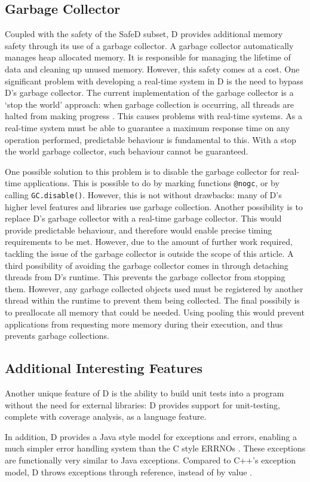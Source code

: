 \subsection{Garbage Collector}
Coupled with the safety of the SafeD subset, D provides additional memory
safety through its use of a garbage collector. A garbage collector
automatically manages heap allocated memory. It is responsible for managing
the lifetime of data and cleaning up unused memory. 
However, this safety comes at a cost. One significant problem with developing a 
real-time system in D is the need to bypass D's garbage collector. 
The current implementation of the garbage 
collector is a `stop the world' approach: when garbage collection is occurring, 
all threads are halted from making progress 
\cite{dlang-garbage}. This causes problems with 
real-time systems. As a real-time system must be able to guarantee a maximum response 
time on any operation performed, predictable behaviour is fundamental to this. 
With a stop the world garbage collector, such behaviour cannot be guaranteed. 
\par\bigskip\noindent
One possible solution to this problem is to disable the garbage collector for 
real-time applications. This is possible to do by marking functions \texttt{@nogc}, 
or by calling \texttt{GC.disable()}. However, this is not without drawbacks: 
many of D's higher level features and libraries use garbage collection. 
Another possibility is to replace D's garbage collector with a real-time 
garbage collector. This would provide predictable behaviour, and therefore
would enable precise timing requirements to be met.
However, due to the amount of further work required, tackling the issue of the garbage 
collector is outside the scope of this article.
A third possibility of avoiding the garbage collector comes in through
detaching threads from D's runtime. This prevents the garbage collector from
stopping them. However, any garbage collected objects used must be registered
by another thread within the runtime to prevent them being collected. 
The final possibily is to preallocate all memory that could be needed. Using
pooling this would prevent applications from requesting more memory during
their execution, and thus prevents garbage collections. 

\subsection{Additional Interesting Features}
Another unique feature of D is the ability to build unit tests into a 
program without the need for external libraries: D provides support for 
unit-testing, complete with coverage analysis, as a language feature. 
\par\bigskip\noindent
In addition, D provides a Java style model for exceptions and errors, enabling 
a much simpler error handling system than the C style ERRNOs 
\cite{ddili-book}. 
These exceptions are functionally very similar to Java exceptions. Compared to
C++'s exception model, D throws exceptions through reference, instead of by
value \cite{interface-to-cpp}. 


